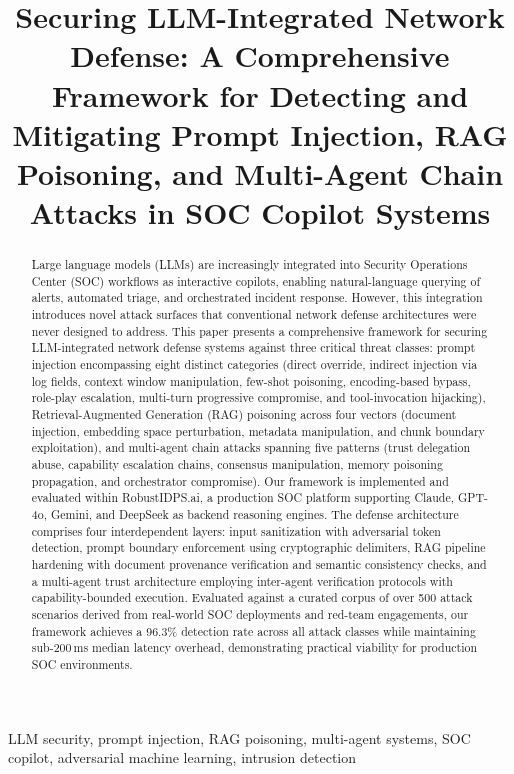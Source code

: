 \documentclass[journal,twoside]{IEEEtran}
\title{Securing LLM-Integrated Network Defense: A Comprehensive Framework for Detecting and Mitigating Prompt Injection, RAG Poisoning, and Multi-Agent Chain Attacks in SOC Copilot Systems}
\author{
  \IEEEauthorblockN{Roger Nick Anaedevha}
  \IEEEauthorblockA{
    National Research Nuclear University MEPhI\\
    Moscow, Russia\\
    roger@robustidps.ai
  }
  \and
  \IEEEauthorblockN{Alexander Gennadievich Trofimov}
  \IEEEauthorblockA{
    National Research Nuclear University MEPhI\\
    Moscow, Russia\\
    agtrofimov@robustidps.ai
  }
}
\begin{document}
\maketitle

\begin{abstract}
Large language models (LLMs) are increasingly integrated into Security Operations Center (SOC) workflows as interactive copilots, enabling natural-language querying of alerts, automated triage, and orchestrated incident response. However, this integration introduces novel attack surfaces that conventional network defense architectures were never designed to address. This paper presents a comprehensive framework for securing LLM-integrated network defense systems against three critical threat classes: prompt injection encompassing eight distinct categories (direct override, indirect injection via log fields, context window manipulation, few-shot poisoning, encoding-based bypass, role-play escalation, multi-turn progressive compromise, and tool-invocation hijacking), Retrieval-Augmented Generation (RAG) poisoning across four vectors (document injection, embedding space perturbation, metadata manipulation, and chunk boundary exploitation), and multi-agent chain attacks spanning five patterns (trust delegation abuse, capability escalation chains, consensus manipulation, memory poisoning propagation, and orchestrator compromise). Our framework is implemented and evaluated within RobustIDPS.ai, a production SOC platform supporting Claude, GPT-4o, Gemini, and DeepSeek as backend reasoning engines. The defense architecture comprises four interdependent layers: input sanitization with adversarial token detection, prompt boundary enforcement using cryptographic delimiters, RAG pipeline hardening with document provenance verification and semantic consistency checks, and a multi-agent trust architecture employing inter-agent verification protocols with capability-bounded execution. Evaluated against a curated corpus of over 500 attack scenarios derived from real-world SOC deployments and red-team engagements, our framework achieves a 96.3\% detection rate across all attack classes while maintaining sub-200\,ms median latency overhead, demonstrating practical viability for production SOC environments.
\end{abstract}

\begin{IEEEkeywords}
LLM security, prompt injection, RAG poisoning, multi-agent systems, SOC copilot, adversarial machine learning, intrusion detection
\end{IEEEkeywords}
\end{document}
